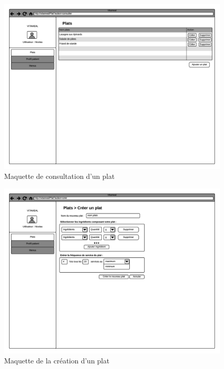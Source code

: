 \documentclass{beamer}
\begin{document}
\begin{frame}[plain]{}
\begin{figure}
\centering
\includegraphics[scale=0.4]{../CasDUtilisations/CompositionPlat/maquette_EcranConsulterPlats.png}
\caption{Maquette de consultation d'un plat}
\label{MaquetteConsultationPlat}
\end{figure}
\end{frame}

\begin{frame}[plain]{}
\begin{figure}
\centering
\includegraphics[scale=0.4]{../CasDUtilisations/CompositionPlat/maquette_EcranCreationPlat.png}
\caption{Maquette de la création d'un plat}
\label{MaquetteCreationPlat}
\end{figure}
\end{frame}
\end{document}
